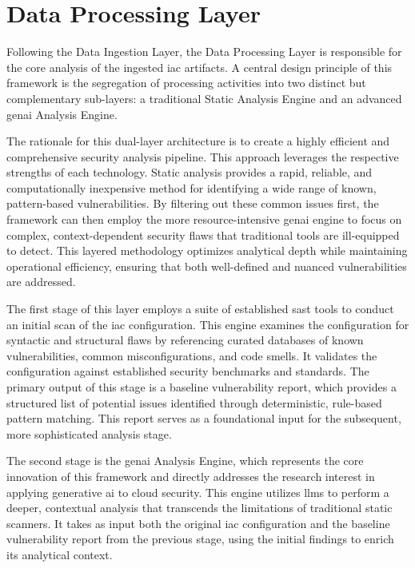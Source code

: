 
\section{Data Processing Layer}
\label{sec:data-processing-layer}

Following the Data Ingestion Layer, the Data Processing Layer is responsible for the core analysis of the ingested \gls{iac} artifacts. A central design principle of this framework is the segregation of processing activities into two distinct but complementary sub-layers: a traditional Static Analysis Engine and an advanced \gls{genai} Analysis Engine.

The rationale for this dual-layer architecture is to create a highly efficient and comprehensive security analysis pipeline. This approach leverages the respective strengths of each technology. Static analysis provides a rapid, reliable, and computationally inexpensive method for identifying a wide range of known, pattern-based vulnerabilities. By filtering out these common issues first, the framework can then employ the more resource-intensive \gls{genai} engine to focus on complex, context-dependent security flaws that traditional tools are ill-equipped to detect. This layered methodology optimizes analytical depth while maintaining operational efficiency, ensuring that both well-defined and nuanced vulnerabilities are addressed.

The first stage of this layer employs a suite of established \gls{sast} tools to conduct an initial scan of the \gls{iac} configuration. This engine examines the configuration for syntactic and structural flaws by referencing curated databases of known vulnerabilities, common misconfigurations, and code smells. It validates the configuration against established security benchmarks and standards. The primary output of this stage is a baseline vulnerability report, which provides a structured list of potential issues identified through deterministic, rule-based pattern matching. This report serves as a foundational input for the subsequent, more sophisticated analysis stage.

The second stage is the \gls{genai} Analysis Engine, which represents the core innovation of this framework and directly addresses the research interest in applying generative \gls{ai} to cloud security. This engine utilizes \glspl{llm} to perform a deeper, contextual analysis that transcends the limitations of traditional static scanners\cite{hayagreevan_security_2024, ling_enhancing_2024}. It takes as input both the original \gls{iac} configuration and the baseline vulnerability report from the previous stage, using the initial findings to enrich its analytical context.

